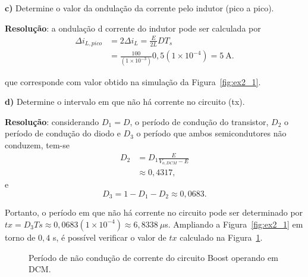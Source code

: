 \medskip
\textbf{c)} Determine o valor da ondulação da corrente pelo indutor (pico a pico).

\medskip
\textbf{Resolução}: a ondulação d corrente do indutor pode ser calculada por~\cite{Eri:20}
\begin{equation*}
	\begin{aligned}
		\Delta i_{L,pico} &= 2\Delta i_{L} = \frac{E}{2L}DT_s \\
		&= \frac{100}{(1\times10^{-3})}0{,}5(1\times 10^{-4}) = 5~\mathrm{A}.
	\end{aligned}
\end{equation*}

que corresponde com valor obtido na simulação da Figura~\ref{fig:ex2_1}.

\medskip
\textbf{d)} Determine o intervalo em que não há corrente no circuito (tx).

\medskip
\textbf{Resolução}: considerando $D_1 = D$, o período de condução do transistor, $D_2$ o período de condução do diodo e $D_3$ o período que ambos semicondutores não conduzem, tem-se~\cite{Eri:20}
\begin{equation*}
	\begin{aligned}
		D_2 &= D_1\frac{E}{V_{o,DCM} - E} \\
		&\approx 0{,}4317,
	\end{aligned}
\end{equation*}
e
\begin{equation*}
	D_3 = 1 - D_1 - D_2 \approx 0{,}0683.
\end{equation*}

Portanto, o período em que não há corrente no circuito pode ser determinado por $tx = D_3Ts \approx 0{,}0683(1\times 10^{-4}) \approx 6{,}8338~\mu$s. Ampliando a Figura~\ref{fig:ex2_1} em torno de $0{,}4$ s, é possível verificar o valor de $tx$ calculado na Figura~\ref{fig:ex2_2}.
\begin{figure}[htb!]
	\centering
	
	\caption{Período de não condução de corrente do circuito Boost operando em DCM.}
	\label{fig:ex2_2}
\end{figure}